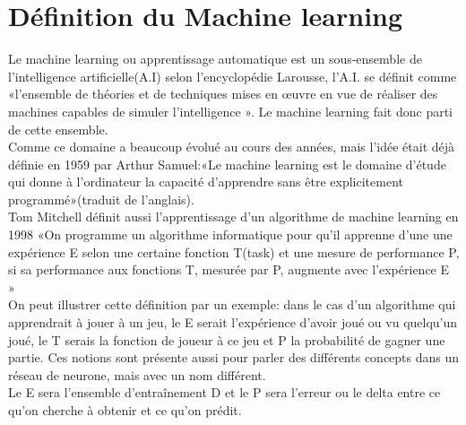 \documentclass[openany,14pt,fleqn]{book} %
\begin{document}
\section{Définition du Machine learning}
Le machine learning ou apprentissage automatique est un sous-ensemble de l'intelligence artificielle(A.I) selon l'encyclopédie Larousse, l'A.I. se définit comme  «l'ensemble de théories et de techniques mises en œuvre en vue de réaliser des machines capables de simuler l'intelligence »\cite{Wikipedia_def}. Le machine learning fait donc parti de cette ensemble.\\
Comme ce domaine a beaucoup évolué au cours des années, mais l'idée était déjà définie en 1959 par Arthur Samuel:«Le machine learning est le domaine d'étude qui donne à l'ordinateur la capacité d'apprendre sans être explicitement programmé»(traduit de l'anglais).\\
Tom Mitchell définit aussi l'apprentissage d'un algorithme de machine learning en 1998 «On programme un algorithme informatique pour qu'il apprenne d'une une expérience E selon une certaine fonction T(task) et une mesure de performance P, si sa performance aux fonctions T, mesurée par P, augmente avec l'expérience E »\\ 
On peut illustrer cette définition par un exemple: dans le  cas d'un algorithme qui apprendrait à jouer à un jeu, le E serait l'expérience d'avoir joué ou vu quelqu'un joué, le T serais la fonction de joueur à ce jeu et P la probabilité de gagner une partie. Ces notions sont présente aussi pour parler des différents concepts dans un réseau de neurone, mais avec un nom différent.\\ 
Le E sera l'ensemble d'entraînement D et le P sera l'erreur ou le delta entre ce qu'on cherche à obtenir et ce qu'on prédit.\cite{Coursera}
\end{document}
